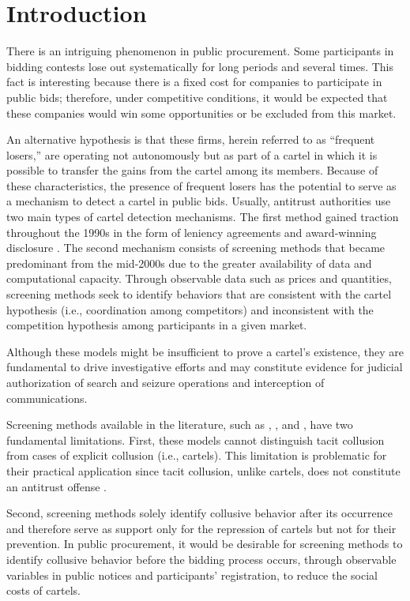 \section{Introduction}
\label{sec:introduction}

There is an intriguing phenomenon in public procurement. Some participants in bidding contests lose out systematically for long periods and several times. This fact is interesting because there is a fixed cost for companies to participate in public bids; therefore, under competitive conditions, it would be expected that these companies would win some opportunities or be excluded from this market.

An alternative hypothesis is that these firms, herein referred to as ``frequent losers,'' are operating not autonomously but as part of a cartel in which it is possible to transfer the gains from the cartel among its members. Because of these characteristics, the presence of frequent losers has the potential to serve as a mechanism to detect a cartel in public bids. Usually, antitrust authorities use two main types of cartel detection mechanisms. The first method gained traction throughout the 1990s in the form of leniency agreements and award-winning disclosure \citep{wils2007leniency}. The second mechanism consists of screening methods that became predominant from the mid-2000s due to the greater availability of data and computational capacity. Through observable data such as prices and quantities, screening methods seek to identify behaviors that are consistent with the cartel hypothesis (i.e., coordination among competitors) and inconsistent with the competition hypothesis among participants in a given market.

Although these models might be insufficient to prove a cartel's existence, they are fundamental to drive investigative efforts and may constitute evidence for judicial authorization of search and seizure operations and interception of communications.

Screening methods available in the literature, such as \citet{green1984noncooperative}, \citet{haltiwanger1991the}, and \citet{abrantesmetz2006a}, have two fundamental limitations. First, these models cannot distinguish tacit collusion from cases of explicit collusion (i.e., cartels). This limitation is problematic for their practical application since tacit collusion, unlike cartels, does not constitute an antitrust offense \citep{harrington2008detecting}.

Second, screening methods solely identify collusive behavior after its occurrence and therefore serve as support only for the repression of cartels but not for their prevention. In public procurement, it would be desirable for screening methods to identify collusive behavior before the bidding process occurs, through observable variables in public notices and participants' registration, to reduce the social costs of cartels.

